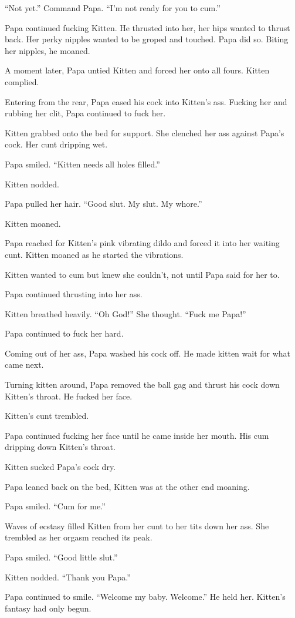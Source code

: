     “Not yet.” Command Papa. “I’m not ready for you to cum.”

     Papa continued fucking Kitten. He thrusted into her, her hips wanted to thrust back. Her perky nipples wanted to be groped and touched. Papa did so. Biting her nipples, he moaned.

     A moment later, Papa untied Kitten and forced her onto all fours. Kitten complied.

     Entering from the rear, Papa eased his cock into Kitten’s ass. Fucking her and rubbing her clit, Papa continued to fuck her.

     Kitten grabbed onto the bed for support. She clenched her ass against Papa’s cock. Her cunt dripping wet.

     Papa smiled. “Kitten needs all holes filled.”

     Kitten nodded.

     Papa pulled her hair. “Good slut. My slut. My whore.”

     Kitten moaned.

     Papa reached for Kitten’s pink vibrating dildo and forced it into her waiting cunt. Kitten moaned as he started the vibrations.

     Kitten wanted to cum but knew she couldn’t, not until Papa said for her to.

     Papa continued thrusting into her ass.

     Kitten breathed heavily. “Oh God!” She thought. “Fuck me Papa!”

     Papa continued to fuck her hard.

     Coming out of her ass, Papa washed his cock off. He made kitten wait for what came next.

     Turning kitten around, Papa removed the ball gag and thrust his cock down Kitten’s throat. He fucked her face.

     Kitten’s cunt trembled.

     Papa continued fucking her face until he came inside her mouth. His cum dripping down Kitten’s throat.

     Kitten sucked Papa’s cock dry.

     Papa leaned back on the bed, Kitten was at the other end moaning.

     Papa smiled. “Cum for me.”

     Waves of ecstasy filled Kitten from her cunt to her tits down her ass. She trembled as her orgasm reached its peak.

     Papa smiled. “Good little slut.”

     Kitten nodded. “Thank you Papa.”

     Papa continued to smile. “Welcome my baby. Welcome.”
     He held her. Kitten’s fantasy had only begun.
